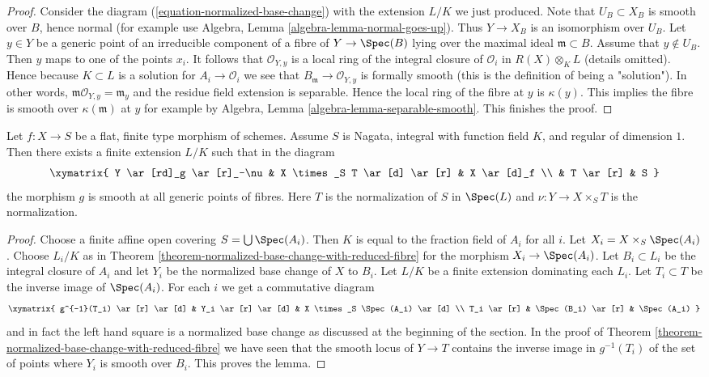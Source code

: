 \begin{proof}
\medskip\noindent
Consider the diagram (\ref{equation-normalized-base-change})
with the extension $L/K$ we just produced. Note that $U_B \subset X_B$
is smooth over $B$, hence normal (for example use
Algebra, Lemma \ref{algebra-lemma-normal-goes-up}).
Thus $Y \to X_B$ is an isomorphism over $U_B$.
Let $y \in Y$ be a generic point of an irreducible
component of a fibre of $Y \to \Spec(B)$ lying over the maximal
ideal $\mathfrak m \subset B$. Assume that $y \not \in U_B$.
Then $y$ maps to one of the points $x_i$. It follows that
$\mathcal{O}_{Y, y}$ is a local ring of the integral closure
of $\mathcal{O}_i$ in $R(X) \otimes_K L$ (details omitted).
Hence because $K \subset L$ is a solution for
$A_i \to \mathcal{O}_i$ we see that
$B_\mathfrak m \to \mathcal{O}_{Y, y}$ is formally smooth
(this is the definition of being a "solution").
In other words, $\mathfrak m\mathcal{O}_{Y, y} = \mathfrak m_y$
and the residue field extension is separable. Hence the local ring
of the fibre at $y$ is $\kappa(y)$.
This implies the fibre is smooth over $\kappa(\mathfrak m)$
at $y$ for example by Algebra, Lemma \ref{algebra-lemma-separable-smooth}.
This finishes the proof.
\end{proof}

\begin{lemma}
\label{lemma-normalized-base-change-with-reduced-fibre-over-curve}
Let $f : X \to S$ be a flat, finite type morphism of schemes.
Assume $S$ is Nagata, integral with function field $K$, and
regular of dimension $1$. Then there exists a finite extension $L/K$
such that in the diagram
$$
\xymatrix{
Y \ar[rd]_g \ar[r]_-\nu & X \times_S T \ar[d] \ar[r] & X \ar[d]_f \\
& T \ar[r] & S
}
$$
the morphism $g$ is smooth at all generic points of fibres. Here
$T$ is the normalization of $S$ in $\Spec(L)$ and $\nu : Y \to X \times_S T$
is the normalization.
\end{lemma}

\begin{proof}
Choose a finite affine open covering $S = \bigcup \Spec(A_i)$.
Then $K$ is equal to the fraction field of $A_i$ for all $i$.
Let $X_i = X \times_S \Spec(A_i)$.
Choose $L_i/K$ as in
Theorem \ref{theorem-normalized-base-change-with-reduced-fibre}
for the morphism $X_i \to \Spec(A_i)$.
Let $B_i \subset L_i$ be the integral closure of $A_i$ and
let $Y_i$ be the normalized base change of $X$ to $B_i$.
Let $L/K$ be a finite extension dominating each $L_i$.
Let $T_i \subset T$ be the inverse image of $\Spec(A_i)$.
For each $i$ we get a commutative diagram
$$
\xymatrix{
g^{-1}(T_i) \ar[r] \ar[d] & Y_i \ar[r] \ar[d] & X \times_S \Spec(A_i) \ar[d] \\
T_i \ar[r] & \Spec(B_i) \ar[r] & \Spec(A_i)
}
$$
and in fact the left hand square is a normalized base change
as discussed at the beginning of the section. In the proof
of Theorem \ref{theorem-normalized-base-change-with-reduced-fibre}
we have seen that the smooth locus of $Y \to T$ contains the
inverse image in $g^{-1}(T_i)$ of the set of points
where $Y_i$ is smooth over $B_i$. This proves the lemma.
\end{proof}


